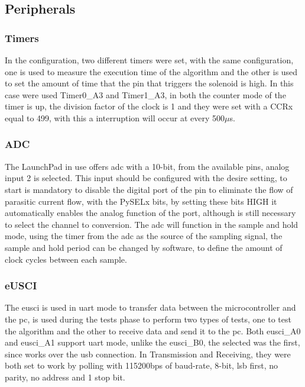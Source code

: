 \subsection{Peripherals}
\subsubsection*{Timers}
In the configuration, two different timers were set, with the same configuration, one is used to measure the execution time of the algorithm and the other is used to set the amount of time that the pin that triggers the solenoid is high. In this case were used Timer0\_A3 and Timer1\_A3, in both the counter mode of the timer is up, the division factor of the clock is 1 and they were set with a CCRx equal to 499, with this a interruption will occur at every 500$\mu$s.
\subsubsection*{ADC}
The LaunchPad in use offers \acrshort{adc} with a 10-bit, from the available pins, analog input 2 is selected. This input should be configured with the desire setting, to start is mandatory to disable the digital port of the pin to eliminate the flow of parasitic current flow, with the PySELx bits, by setting these bits HIGH it automatically enables the analog function of the port, although is still necessary to select the channel to conversion. The \acrshort{adc} will function in the sample and hold mode, using the timer from the \acrshort{adc} as the source of the sampling signal, the sample and hold period can be changed by software, to define the amount of clock cycles between each sample. 
\subsubsection*{eUSCI}
The \acrshort{eusci} is used in \acrshort{uart} mode to transfer data between the microcontroller and the \acrshort{pc}, is used during the tests phase to perform two types of tests, one to test the algorithm and the other to receive data and send it to the \acrshort{pc}. Both \acrshort{eusci}\_A0 and \acrshort{eusci}\_A1 support \acrshort{uart} mode, unlike the \acrshort{eusci}\_B0, the selected was the first, since works over the \acrshort{usb} connection. In Transmission and Receiving, they were both set to work by polling with 115200bps of baud-rate, 8-bit, \acrshort{lsb} first, no parity, no address and 1 stop bit.
